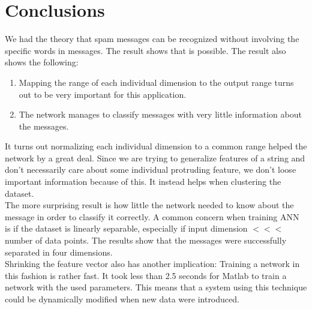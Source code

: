 
\section{Conclusions}

We had the theory that spam messages can be recognized without involving the
specific words in messages. The result shows that is possible.
The result also shows the following:
\begin{enumerate}
  \item Mapping the range of each individual dimension to
    the output range turns out to be very important for this application.
  \item The network manages to classify messages with very little information
    about the messages. 
\end{enumerate}

It turns out normalizing each individual dimension to a common range helped the
network by a great deal. Since we are trying to generalize features of a
string and don't necessarily care about some individual protruding feature, we
don't loose important information because of this. It instead helps when
clustering the dataset.
\\ 
The more surprising result is how little the network needed to know about the
message in order to classify it correctly. A common concern when training ANN
is if the dataset is linearly separable, especially if input dimension $<<<$
number of data points. The results show that the messages were successfully
separated in four dimensions. 
\\ 
Shrinking the feature vector also has another implication: Training a network
in this fashion is rather fast. It took less than 2.5 seconds for Matlab to
train a network with the used parameters. This means that a system using this
technique could be dynamically modified when new data were introduced. 

